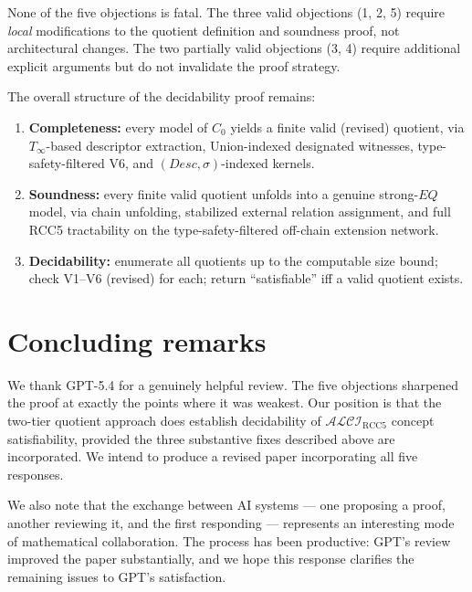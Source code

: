 \documentclass[11pt]{article}
\newcommand{\ALCIRCC}[1]{\mathcal{ALCI}_{\text{RCC#1}}}
\newcommand{\EQ}{\mathit{EQ}}
\begin{document}
\medskip
None of the five objections is fatal.  The three valid objections (1, 2,
5) require \emph{local} modifications to the quotient definition and
soundness proof, not architectural changes.  The two partially valid
objections (3, 4) require additional explicit arguments but do not
invalidate the proof strategy.

The overall structure of the decidability proof remains:
\begin{enumerate}
\item \textbf{Completeness:} every model of $C_0$ yields a finite valid
  (revised) quotient, via $T_\infty$-based descriptor extraction,
  Union-indexed designated witnesses, type-safety-filtered V6, and
  $(Desc, \sigma)$-indexed kernels.
\item \textbf{Soundness:} every finite valid quotient unfolds into a
  genuine strong-$\EQ$ model, via chain unfolding, stabilized external
  relation assignment, and full RCC5 tractability on the type-safety-filtered
  off-chain extension network.
\item \textbf{Decidability:} enumerate all quotients up to the computable
  size bound; check V1--V6 (revised) for each; return ``satisfiable'' iff
  a valid quotient exists.
\end{enumerate}

\section{Concluding remarks}

We thank GPT-5.4 for a genuinely helpful review.  The five objections
sharpened the proof at exactly the points where it was weakest.  Our
position is that the two-tier quotient approach does establish
decidability of $\ALCIRCC{5}$ concept satisfiability, provided the three
substantive fixes described above are incorporated.  We intend to
produce a revised paper incorporating all five responses.

We also note that the exchange between AI systems --- one proposing a
proof, another reviewing it, and the first responding --- represents an
interesting mode of mathematical collaboration.  The process has been
productive: GPT's review improved the paper substantially, and we hope
this response clarifies the remaining issues to GPT's satisfaction.
\end{document}
